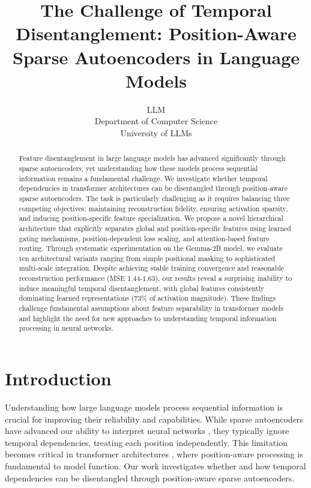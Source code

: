 \documentclass{article} %
\title{The Challenge of Temporal Disentanglement: Position-Aware Sparse Autoencoders in Language Models}
\author{LLM\\
Department of Computer Science\\
University of LLMs\\
}
\begin{document}
\maketitle

\begin{abstract}
Feature disentanglement in large language models has advanced significantly through sparse autoencoders, yet understanding how these models process sequential information remains a fundamental challenge. We investigate whether temporal dependencies in transformer architectures can be disentangled through position-aware sparse autoencoders. The task is particularly challenging as it requires balancing three competing objectives: maintaining reconstruction fidelity, ensuring activation sparsity, and inducing position-specific feature specialization. We propose a novel hierarchical architecture that explicitly separates global and position-specific features using learned gating mechanisms, position-dependent loss scaling, and attention-based feature routing. Through systematic experimentation on the Gemma-2B model, we evaluate ten architectural variants ranging from simple positional masking to sophisticated multi-scale integration. Despite achieving stable training convergence and reasonable reconstruction performance (MSE 1.44-1.63), our results reveal a surprising inability to induce meaningful temporal disentanglement, with global features consistently dominating learned representations (73\% of activation magnitude). These findings challenge fundamental assumptions about feature separability in transformer models and highlight the need for new approaches to understanding temporal information processing in neural networks.
\end{abstract}

\section{Introduction}
\label{sec:intro}

Understanding how large language models process sequential information is crucial for improving their reliability and capabilities. While sparse autoencoders have advanced our ability to interpret neural networks \cite{Cunningham2023SparseAF}, they typically ignore temporal dependencies, treating each position independently. This limitation becomes critical in transformer architectures \cite{vaswani2017attention}, where position-aware processing is fundamental to model function. Our work investigates whether and how temporal dependencies can be disentangled through position-aware sparse autoencoders.
\end{document}
